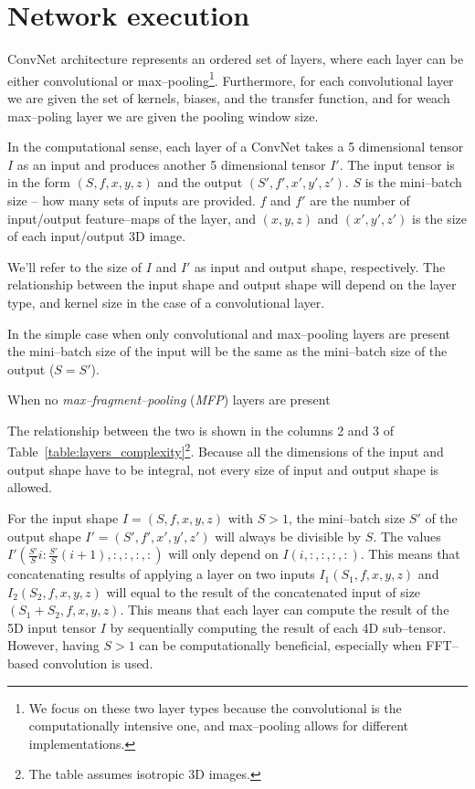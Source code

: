 \documentclass[conference]{IEEEtran}
\begin{document}
\section{Network execution}

  ConvNet architecture represents an ordered set of layers, where each
  layer can be either convolutional or max--pooling\footnote{We focus
    on these two layer types because the convolutional is the
    computationally intensive one, and max--pooling allows for
    different implementations.}.  Furthermore, for each convolutional
  layer we are given the set of kernels, biases, and the transfer
  function, and for weach max--poling layer we are given the pooling
  window size.

  In the computational sense, each layer of a ConvNet takes a 5
  dimensional tensor $I$ as an input and produces another 5
  dimensional tensor $I'$.  The input tensor is in the form
  $(S,f,x,y,z)$ and the output $(S',f',x',y',z')$.  $S$ is the
  mini--batch size -- how many sets of inputs are provided.  $f$ and
  $f'$ are the number of input/output feature--maps of the layer, and
  $(x,y,z)$ and $(x',y',z')$ is the size of each input/output 3D
  image.

  We'll refer to the size of $I$ and $I'$ as input and output shape,
  respectively.  The relationship between the input shape and output
  shape will depend on the layer type, and kernel size in the case of
  a convolutional layer.

  In the simple case when only convolutional and max--pooling layers
  are present the mini--batch size of the input will be the same as
  the mini--batch size of the output ($S = S'$).

  When no \emph{max--fragment--pooling} (\emph{MFP}) layers are
  present

  The relationship between the two is shown in
  the columns 2 and 3 of
  Table~\ref{table:layers_complexity}\footnote{The table assumes
    isotropic 3D images.}.  Because all the dimensions of the input
  and output shape have to be integral, not every size of input and
  output shape is allowed.

  For the input shape $I = (S,f,x,y,z)$ with $S > 1$, the mini--batch
  size $S'$ of the output shape $I' = (S',f',x',y',z')$ will always be
  divisible by $S$.  The values $I'(\frac{S'}{S} i : \frac{S'}{S}
  (i+1),:,:,:,:)$ will only depend on $I(i,:,:,:,:)$.  This means that
  concatenating results of applying a layer on two inputs
  $I_1(S_1,f,x,y,z)$ and $I_2(S_2,f,x,y,z)$ will equal to the result
  of the concatenated input of size $(S_1+S_2,f,x,y,z)$.  This means
  that each layer can compute the result of the 5D input tensor $I$ by
  sequentially computing the result of each 4D sub--tensor.  However,
  having $S > 1$ can be computationally beneficial, especially when
  FFT--based convolution is used.
\end{document}
